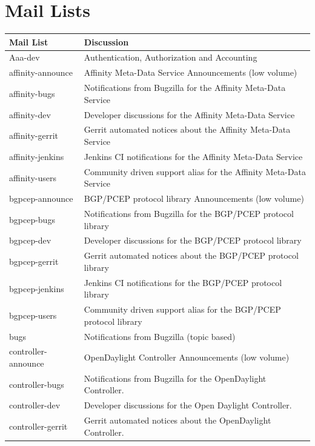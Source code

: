 \documentclass[a4paper, 12pt]{book}
\begin{document}
\chapter{Mail Lists}
\label{chap:appendix_mail_lists}
\begin{longtable}{|p{4cm}|p{10cm}|}
\hline
\textbf{Mail List} & \textbf{Discussion} \\ \hline
Aaa-dev &	Authentication, Authorization and Accounting \\ \hline
affinity-announce &	Affinity Meta-Data Service Announcements (low volume) \\ \hline
affinity-bugs &	Notifications from Bugzilla for the Affinity Meta-Data Service \\ \hline
affinity-dev &	Developer discussions for the Affinity Meta-Data Service \\ \hline
affinity-gerrit &	Gerrit automated notices about the Affinity Meta-Data Service \\ \hline
affinity-jenkins &	Jenkins CI notifications for the Affinity Meta-Data Service \\ \hline
affinity-users &	Community driven support alias for the Affinity Meta-Data Service \\ \hline
bgpcep-announce &	BGP/PCEP protocol library Announcements (low volume) \\ \hline
bgpcep-bugs &	Notifications from Bugzilla for the BGP/PCEP protocol library \\ \hline
bgpcep-dev &	Developer discussions for the BGP/PCEP protocol library \\ \hline
bgpcep-gerrit &	Gerrit automated notices about the BGP/PCEP protocol library \\ \hline
bgpcep-jenkins &	Jenkins CI notifications for the BGP/PCEP protocol library \\ \hline
bgpcep-users &	Community driven support alias for the BGP/PCEP protocol library \\ \hline
bugs &	Notifications from Bugzilla (topic based) \\ \hline
controller-announce &	OpenDaylight Controller Announcements (low volume) \\ \hline
controller-bugs &	Notifications from Bugzilla for the OpenDaylight Controller. \\ \hline
controller-dev &	Developer discussions for the Open Daylight Controller. \\ \hline
controller-gerrit &	Gerrit automated notices about the OpenDaylight Controller. \\ \hline

\end{longtable}
\end{document}
